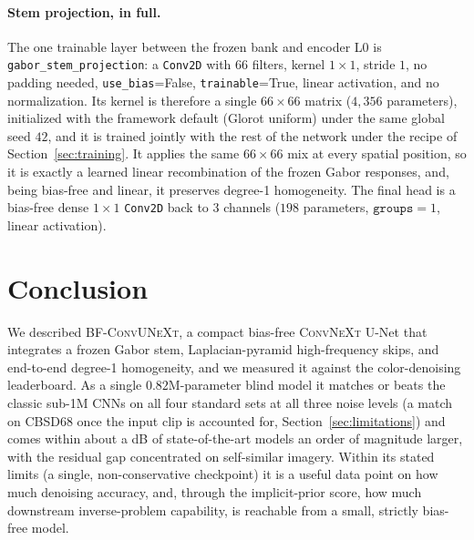 \documentclass{article}
\newcommand{\model}{\textsc{BF-ConvUNeXt}}
\newcommand{\convnext}{\textsc{ConvNeXt}}
\begin{document}
\paragraph{Stem projection, in full.} The one trainable layer between the frozen bank and encoder L0 is \texttt{gabor\_\allowbreak stem\_\allowbreak projection}: a \texttt{Conv2D} with $66$ filters, kernel $1{\times}1$, stride $1$, no padding needed, \texttt{use\_bias}=False, \texttt{trainable}=True, linear activation, and no normalization. Its kernel is therefore a single $66\times66$ matrix ($4{,}356$ parameters), initialized with the framework default (Glorot uniform) under the same global seed $42$, and it is trained jointly with the rest of the network under the recipe of Section~\ref{sec:training}. It applies the same $66\times66$ mix at every spatial position, so it is exactly a learned linear recombination of the frozen Gabor responses, and, being bias-free and linear, it preserves degree-1 homogeneity. The final head is a bias-free dense $1{\times}1$ \texttt{Conv2D} back to $3$ channels ($198$ parameters, $\texttt{groups}=1$, linear activation).

\section{Conclusion}
\label{sec:conclusion}

We described \model{}, a compact bias-free \convnext{} U-Net that integrates a frozen Gabor stem, Laplacian-pyramid high-frequency skips, and end-to-end degree-1 homogeneity, and we measured it against the color-denoising leaderboard. As a single $0.82$M-parameter blind model it matches or beats the classic sub-1M CNNs on all four standard sets at all three noise levels (a match on CBSD68 once the input clip is accounted for, Section~\ref{sec:limitations}) and comes within about a dB of state-of-the-art models an order of magnitude larger, with the residual gap concentrated on self-similar imagery. Within its stated limits (a single, non-conservative checkpoint) it is a useful data point on how much denoising accuracy, and, through the implicit-prior score, how much downstream inverse-problem capability, is reachable from a small, strictly bias-free model.
\end{document}
